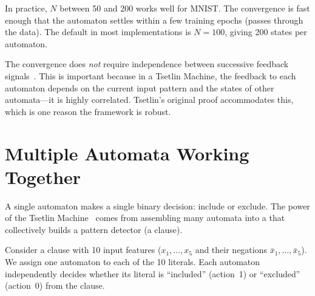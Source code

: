 \begin{engineernote}
In practice, $N$ between 50 and 200 works well for MNIST. The
convergence is fast enough that the automaton settles within a few
training epochs (passes through the data). The default in most
implementations is $N = 100$, giving 200 states per automaton.
\end{engineernote}

The convergence does \emph{not} require independence between
successive feedback signals~\cite{zhang2021convergence}. This is important because in a Tsetlin
Machine, the feedback to each automaton depends on the current input
pattern and the states of other automata---it is highly correlated.
Tsetlin's original proof accommodates this, which is one reason the
framework is robust.


\section{Multiple Automata Working Together}
\label{sec:team}

A single automaton makes a single binary decision: include or exclude.
The power of the Tsetlin Machine~\cite{granmo2018tsetlin} comes from assembling many automata
into a  that collectively builds a pattern detector (a
clause).

Consider a clause with 10 input features ($x_1, \ldots, x_5$ and
their negations $\bar{x}_1, \ldots, \bar{x}_5$). We assign one
automaton to each of the 10 literals. Each automaton independently
decides whether its literal is ``included'' (action~1) or
``excluded'' (action~0) from the clause.

